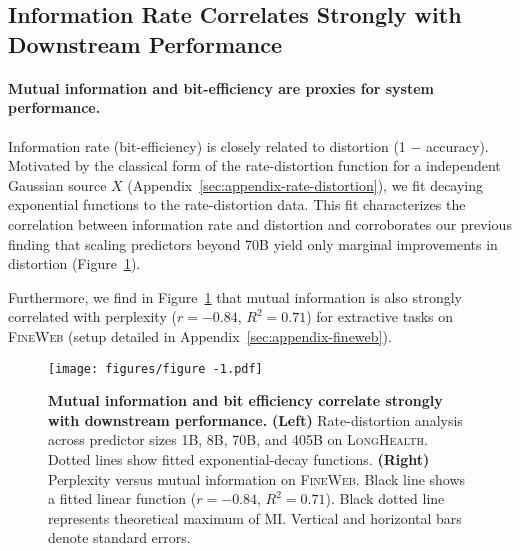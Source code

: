 \documentclass{article} %
\begin{document}
\subsection{Information Rate Correlates Strongly with Downstream Performance}
\label{sec:rate-distortion-correlation}

\paragraph*{Mutual information and bit-efficiency are proxies for system performance.} \noindent Information rate (bit-efficiency) is closely related to distortion (1 $-$ accuracy). Motivated by the classical form of the rate-distortion function for a independent Gaussian source $X$ (Appendix~\ref{sec:appendix-rate-distortion}), we fit decaying exponential functions to the rate-distortion data. This fit characterizes the correlation between information rate and distortion and corroborates our previous finding that scaling predictors beyond 70B yield only marginal improvements in distortion (Figure~\ref{fig:figure-1000-mi-correlation}).

Furthermore, we find in Figure~\ref{fig:figure-1000-mi-correlation} that mutual information is also strongly correlated with perplexity ($r=-0.84$, $R^2 = 0.71$) for extractive tasks on \textsc{FineWeb} (setup detailed in Appendix~\ref{sec:appendix-fineweb}).

\begin{figure}[h!]
    \centering
    \texttt{[image: figures/figure -1.pdf]}
    \caption{\textbf{Mutual information and bit efficiency correlate strongly with downstream performance.} \textbf{(Left)} Rate-distortion analysis across predictor sizes 1B, 8B, 70B, and 405B on \textsc{LongHealth}. Dotted lines show fitted exponential-decay functions. \textbf{(Right)} Perplexity versus mutual information on \textsc{FineWeb}. Black line shows a fitted linear function ($r=-0.84$, $R^2 = 0.71$). Black dotted line represents theoretical maximum of MI.
    Vertical and horizontal bars denote standard errors.
    }
    \label{fig:figure-1000-mi-correlation}
\end{figure}
\end{document}
